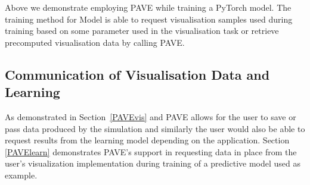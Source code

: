 Above we demonstrate employing PAVE while training a PyTorch model. The training method for Model is able to request visualisation samples used during training based on some parameter used in the visualisation task or retrieve precomputed visualisation data by calling PAVE.
 
\subsection{Communication of Visualisation Data and Learning}

As demonstrated in Section~\ref{PAVEvis} and PAVE allows for the user to save or pass data produced by the simulation and similarly the user would also be able to request results from the learning model depending on the application. Section \ref{PAVElearn} demonstrates PAVE's support in requesting data in place from the user's visualization implementation during training of a predictive model used as example. 
